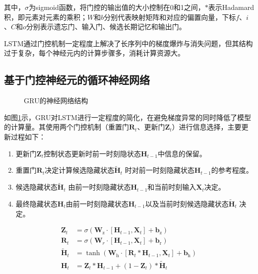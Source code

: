 其中，$\sigma$为sigmoid函数，将门控的输出值的大小控制在0和1之间，$\ast$表示Hadamard积，即元素对元素的乘积；$W$和$b$分别代表映射矩阵和对应的偏置向量，下标$f$、$i$、$C$和$o$分别表示遗忘门、输入门、候选长期记忆和输出门。

LSTM通过门控机制一定程度上解决了长序列中的梯度爆炸与消失问题，但其结构过于复杂，每个神经元内的计算步骤多，消耗计算资源大。

\subsection{基于门控神经元的循环神经网络}
\begin{figure}[htbp]
    \centering
    
    \caption{GRU的神经网络结构\cite{zhang2023dive}}
    \label{fig:gru_struct}
\end{figure}

如图\ref{fig:gru_struct}示，GRU对LSTM进行一定程度的简化，在避免梯度异常的同时降低了模型的计算量。其使用两个门控机制（重置门$\mathbf{R}_t$、更新门$\mathbf{Z}_t$）进行信息选择，主要更新过程如下：
\begin{enumerate}
    \item 更新门$\mathbf{Z}_t$控制状态更新时前一时刻隐状态$\mathbf{H}_{t-1}$中信息的保留。
    \item 重置门$\mathbf{R}_t$决定计算候选隐藏状态$\tilde{\mathbf{H}}_t$ 时对前一时刻隐藏状态$\mathbf{H}_{t-1}$的参考程度。
    \item 候选隐藏状态$\tilde{\mathbf{H}}_t$ 由前一时刻隐藏状态$\mathbf{H}_{t-1}$和当前时刻输入$\mathbf{X}_t$决定。
    \item 最终隐藏状态$\mathbf{H}_t$由前一时刻隐藏状态$\mathbf{H}_{t-1}$以及当前时刻候选隐藏状态$\tilde{\mathbf{H}}_t$ 决定。
\end{enumerate}

\begin{equation}
    \begin{aligned}
        \mathbf{Z}_t &= \sigma(\mathbf{W}_{\mathrm{z}} \cdot [\mathbf{H}_{t-1}, \mathbf{X}_t] + \mathbf{b}_{\mathrm{z}})\\
        \mathbf{R}_t &= \sigma(\mathbf{W}_r \cdot [\mathbf{H}_{t-1}, \mathbf{X}_t] + \mathbf{b}_{\mathrm{r}})\\
        \tilde{\mathbf{H}}_t &= \tanh(\mathbf{W}_{\mathrm{h}} \cdot [\mathbf{R}_t \ast \mathbf{H}_{t-1}, \mathbf{X}_t] + \mathbf{b}_{\mathrm{h}})\\
        \mathbf{H}_t &= \mathbf{Z}_t \ast \mathbf{H}_{t-1} + (1 - \mathbf{Z}_t) \ast \tilde{\mathbf{H}}_t
    \end{aligned}   
\end{equation}

